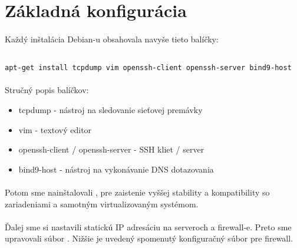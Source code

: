 \section{Základná konfigurácia}
\paragraph{}
Každý inštalácia Debian-u obsahovala navyše tieto balíčky:

\noindent
{\selectfont
\begin{small}
\begin{verbatim}

apt-get install tcpdump vim openssh-client openssh-server bind9-host

\end{verbatim}
\end{small}
}

\paragraph{}
Stručný popis balíčkov:

\begin{itemize}
\item tcpdump - nástroj na sledovanie sieťovej premávky
\item vim - textový editor
\item openssh-client / openssh-server - SSH kliet / server
\item bind9-host - nástroj na vykonávanie DNS dotazovania
\end{itemize}

\paragraph{}
Potom sme nainštalovali , pre zaistenie vyššej stability a kompatibility so zariadeniami a samotným virtualizovaným systémom.

\paragraph{}
Ďalej sme si nastavili statickú IP adresáciu na serveroch a firewall-e. Preto sme upravovali súbor . Nižšie je uvedený spomenutý konfiguračný súbor pre firewall.

